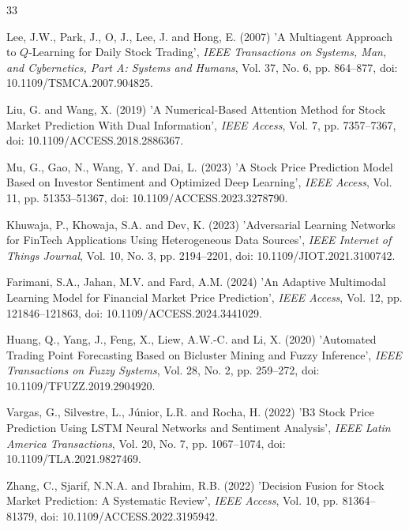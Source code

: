 \documentclass{singlecol-new}
\theoremstyle{TH}{
\newtheorem{lemma}{Lemma}
\newtheorem{theorem}[lemma]{Theorem}
\newtheorem{corrolary}[lemma]{Corrolary}
\newtheorem{conjecture}[lemma]{Conjecture}
\newtheorem{proposition}[lemma]{Proposition}
\newtheorem{claim}[lemma]{Claim}
\newtheorem{stheorem}[lemma]{Wrong Theorem}
\newtheorem{algorithm}{Algorithm}
}
\theoremstyle{THrm}{
\newtheorem{definition}{Definition}[section]
\newtheorem{question}{Question}[section]
\newtheorem{remark}{Remark}
\newtheorem{scheme}{Scheme}
}
\theoremstyle{THhit}{
\newtheorem{case}{Case}[section]
}
\begin{document}
\begin{thebibliography}{33}

Lee, J.W., Park, J., O, J., Lee, J. and Hong, E. (2007) 'A Multiagent Approach to $Q$-Learning for Daily Stock Trading', {\it IEEE Transactions on Systems, Man, and Cybernetics, Part A: Systems and Humans}, Vol. 37, No. 6, pp. 864--877, doi: 10.1109/TSMCA.2007.904825.

Liu, G. and Wang, X. (2019) 'A Numerical-Based Attention Method for Stock Market Prediction With Dual Information', {\it IEEE Access}, Vol. 7, pp. 7357--7367, doi: 10.1109/ACCESS.2018.2886367.

Mu, G., Gao, N., Wang, Y. and Dai, L. (2023) 'A Stock Price Prediction Model Based on Investor Sentiment and Optimized Deep Learning', {\it IEEE Access}, Vol. 11, pp. 51353--51367, doi: 10.1109/ACCESS.2023.3278790.

Khuwaja, P., Khowaja, S.A. and Dev, K. (2023) 'Adversarial Learning Networks for FinTech Applications Using Heterogeneous Data Sources', {\it IEEE Internet of Things Journal}, Vol. 10, No. 3, pp. 2194--2201, doi: 10.1109/JIOT.2021.3100742.

Farimani, S.A., Jahan, M.V. and Fard, A.M. (2024) 'An Adaptive Multimodal Learning Model for Financial Market Price Prediction', {\it IEEE Access}, Vol. 12, pp. 121846--121863, doi: 10.1109/ACCESS.2024.3441029.

Huang, Q., Yang, J., Feng, X., Liew, A.W.-C. and Li, X. (2020) 'Automated Trading Point Forecasting Based on Bicluster Mining and Fuzzy Inference', {\it IEEE Transactions on Fuzzy Systems}, Vol. 28, No. 2, pp. 259--272, doi: 10.1109/TFUZZ.2019.2904920.

Vargas, G., Silvestre, L., Júnior, L.R. and Rocha, H. (2022) 'B3 Stock Price Prediction Using LSTM Neural Networks and Sentiment Analysis', {\it IEEE Latin America Transactions}, Vol. 20, No. 7, pp. 1067--1074, doi: 10.1109/TLA.2021.9827469.

Zhang, C., Sjarif, N.N.A. and Ibrahim, R.B. (2022) 'Decision Fusion for Stock Market Prediction: A Systematic Review', {\it IEEE Access}, Vol. 10, pp. 81364--81379, doi: 10.1109/ACCESS.2022.3195942.


\end{thebibliography}
\end{document}
